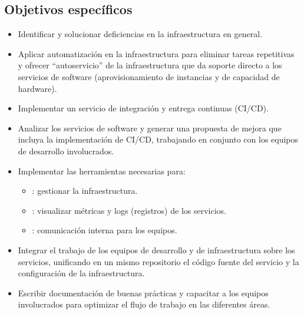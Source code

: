 \subsection{Objetivos específicos}
%
\begin{itemize}
\item Identificar y solucionar deficiencias en la infraestructura en
  general.
\item Aplicar automatización en la infraestructura para eliminar
  tareas repetitivas y ofrecer ``autoservicio'' de la infraestructura
  que da soporte directo a los servicios de software
  (aprovisionamiento de instancias y de capacidad de hardware).
\item Implementar un servicio de integración y entrega continuas
  (CI/CD).
\item Analizar los servicios de software y generar una propuesta de
  mejora que incluya la implementación de CI/CD, trabajando en
  conjunto con los equipos de desarrollo involucrados.
\item Implementar las herramientas necesarias para:
\begin{itemize}
\item {}: gestionar la infraestructura.
\item {}: visualizar métricas y logs (registros)
  de los servicios.
\item {}: comunicación interna para los equipos.
\end{itemize}
\item Integrar el trabajo de los equipos de desarrollo y de
  infraestructura sobre los servicios, unificando en un mismo
  repositorio el código fuente del servicio y la configuración de la
  infraestructura.
\item Escribir documentación de buenas prácticas y capacitar a los
  equipos involucrados para optimizar el flujo de trabajo en las
  diferentes áreas.
\end{itemize}
%
